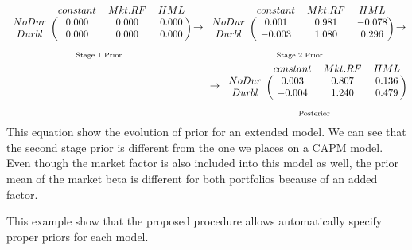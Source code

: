 \begin{eqnarray*}
\underset{\text{Stage 1 Prior}}
{\begin{blockarray}{cccc}
	& constant & Mkt.RF & HML \\ 
	\begin{block}{c(ccc )}
	NoDur & 0.000 & 0.000 & 0.000 \\ 
	Durbl & 0.000 & 0.000 & 0.000 \\ 
	\end{block}
\end{blockarray} }
\rightarrow
\underset{\text{Stage 2 Prior}}
{\begin{blockarray}{cccc}
	& constant & Mkt.RF & HML\\ 
	\begin{block}{c(ccc)}
NoDur & 0.001 & 0.981 & -0.078 \\ 
Durbl & -0.003 & 1.080 & 0.296 \\ 
	\end{block}
\end{blockarray} }
\rightarrow \\
\rightarrow
\underset{\text{Posterior}}
{\begin{blockarray}{cccc}
	& constant & Mkt.RF & HML \\ 
	\begin{block}{c(ccc)}
	NoDur & 0.003 & 0.807 & 0.136 \\ 
	Durbl & -0.004 & 1.240 & 0.479 \\ 
	\end{block}
\end{blockarray} }
\end{eqnarray*}
This equation show the evolution of prior for an extended model. 
We can see that the second stage prior is different from the one we places on a CAPM model. 
Even though the market factor is also included into this model as well, the prior mean of the market beta is different for both portfolios because of an added factor.

This example show that the proposed procedure allows automatically specify proper priors for each model.


